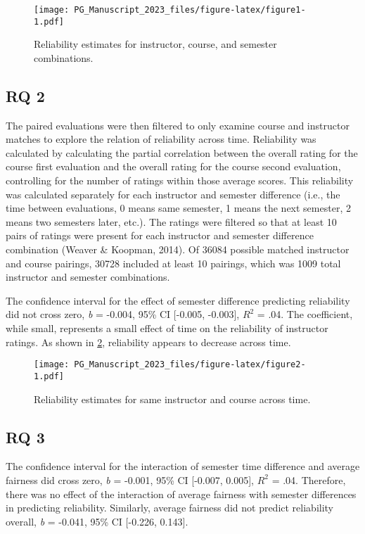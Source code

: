 \documentclass[
  man]{apa7}
\begin{document}
\begin{figure}
\centering
\texttt{[image: PG\_Manuscript\_2023\_files/figure-latex/figure1-1.pdf]}
\caption{\label{fig:figure1}Reliability estimates for instructor, course, and semester combinations.}
\end{figure}

\hypertarget{rq-2-1}{%
\subsection{RQ 2}\label{rq-2-1}}

The paired evaluations were then filtered to only examine course and
instructor matches to explore the relation of reliability across time.
Reliability was calculated by calculating the partial correlation
between the overall rating for the course first evaluation and the
overall rating for the course second evaluation, controlling for the
number of ratings within those average scores. This reliability was
calculated separately for each instructor and semester difference (i.e.,
the time between evaluations, 0 means same semester, 1 means the next
semester, 2 means two semesters later, etc.). The ratings were filtered
so that at least 10 pairs of ratings were present for each instructor
and semester difference combination (Weaver \& Koopman, 2014). Of
36084 possible matched instructor and course pairings,
30728 included at
least 10 pairings, which was 1009 total instructor and
semester combinations.

The confidence interval for the effect of semester difference predicting
reliability did not cross zero, \emph{b} =
-0.004, 95\% CI
{[}-0.005,
-0.003{]}, \(R^2\) =
.04.
The coefficient, while small, represents a small effect of time on the
reliability of instructor ratings. As shown in \ref{fig:figure2},
reliability appears to decrease across time.

\begin{figure}
\centering
\texttt{[image: PG\_Manuscript\_2023\_files/figure-latex/figure2-1.pdf]}
\caption{\label{fig:figure2}Reliability estimates for same instructor and course across time.}
\end{figure}

\hypertarget{rq-3-1}{%
\subsection{RQ 3}\label{rq-3-1}}

The confidence interval for the interaction of semester time difference
and average fairness did cross zero, \emph{b} =
-0.001, 95\% CI
{[}-0.007,
0.005{]}, \(R^2\) =
.04.
Therefore, there was no effect of the interaction of average fairness
with semester differences in predicting reliability. Similarly, average
fairness did not predict reliability overall, \emph{b} =
-0.041, 95\% CI
{[}-0.226,
0.143{]}.
\end{document}
